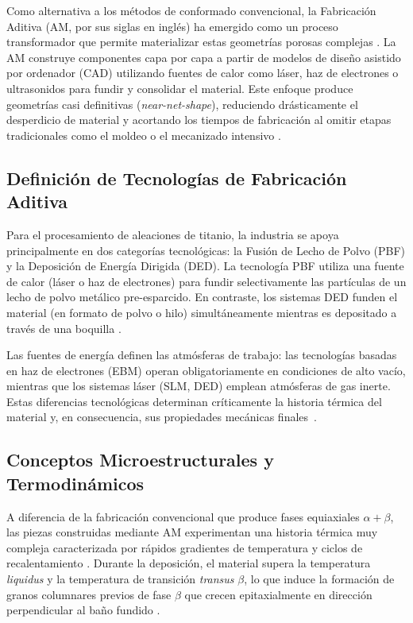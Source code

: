 Como alternativa a los métodos de conformado convencional, la Fabricación Aditiva (AM, por sus siglas en inglés) ha emergido como un proceso transformador que permite materializar estas geometrías porosas complejas \cite{nguyen2022critical}. La AM construye componentes capa por capa a partir de modelos de diseño asistido por ordenador (CAD) utilizando fuentes de calor como láser, haz de electrones o ultrasonidos para fundir y consolidar el material. Este enfoque produce geometrías casi definitivas (\textit{near-net-shape}), reduciendo drásticamente el desperdicio de material y acortando los tiempos de fabricación al omitir etapas tradicionales como el moldeo o el mecanizado intensivo \cite{nguyen2022critical}.

\subsection{Definición de Tecnologías de Fabricación Aditiva}
Para el procesamiento de aleaciones de titanio, la industria se apoya principalmente en dos categorías tecnológicas: la Fusión de Lecho de Polvo (PBF) y la Deposición de Energía Dirigida (DED). La tecnología PBF utiliza una fuente de calor (láser o haz de electrones) para fundir selectivamente las partículas de un lecho de polvo metálico pre-esparcido. En contraste, los sistemas DED funden el material (en formato de polvo o hilo) simultáneamente mientras es depositado a través de una boquilla \cite{neikter2018microstructural,zhai2016microstructure}.

Las fuentes de energía definen las atmósferas de trabajo: las tecnologías basadas en haz de electrones (EBM) operan obligatoriamente en condiciones de alto vacío, mientras que los sistemas láser (SLM, DED) emplean atmósferas de gas inerte. Estas diferencias tecnológicas determinan críticamente la historia térmica del material y, en consecuencia, sus propiedades mecánicas finales~\cite{neikter2018microstructural,zhai2016microstructure}.

\subsection{Conceptos Microestructurales y Termodinámicos}
A diferencia de la fabricación convencional que produce fases equiaxiales $\alpha+\beta$, las piezas construidas mediante AM experimentan una historia térmica muy compleja caracterizada por rápidos gradientes de temperatura y ciclos de recalentamiento \cite{nguyen2022critical}. Durante la deposición, el material supera la temperatura \textit{liquidus} y la temperatura de transición \textit{transus} $\beta$, lo que induce la formación de granos columnares previos de fase $\beta$ que crecen epitaxialmente en dirección perpendicular al baño fundido \cite{zhai2016microstructure}.

